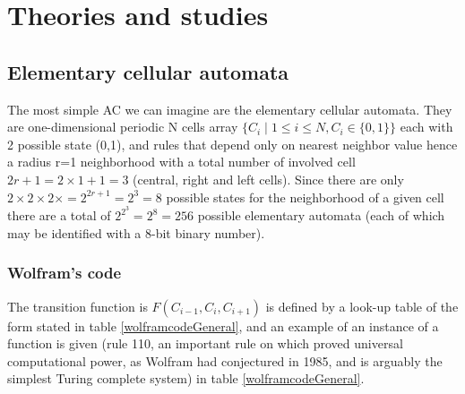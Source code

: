 \section{Theories and studies}

\subsection{Elementary cellular automata}
The most simple AC we can imagine are the elementary cellular
automata\cite{wolfram1983}. They are one-dimensional periodic N cells array
$\{C_i \mid 1\leq i \leq N, C_i \in \{0,1\} \}$ each
with 2 possible state (0,1), and rules that depend only on nearest neighbor
value hence a radius r=1 neighborhood with a total number of involved cell
$2r+1=2\times1+1=3$ (central, right and left cells).
Since there are only $2\times2\times2\times=2^{2r+1}=2^3=8$ possible states for
the neighborhood of a given cell there are a total of
$2^{2^3}=2^8=256$ possible elementary automata (each of
which may be identified with a 8-bit binary number\cite{wolfram2002}).

\subsubsection{Wolfram's code}
The transition function  is $F(C_{i-1},C_i,C_{i+1})$ is
defined by a look-up table of the form stated in table
\ref{wolframcodeGeneral}, and an example of an instance of a function is given
(rule 110, an important rule on which \cite{cook2004} proved universal
computational power, as Wolfram had conjectured in 1985, and is arguably the
simplest Turing complete system\cite{wolfram2002}) in table
\ref{wolframcodeGeneral}.

